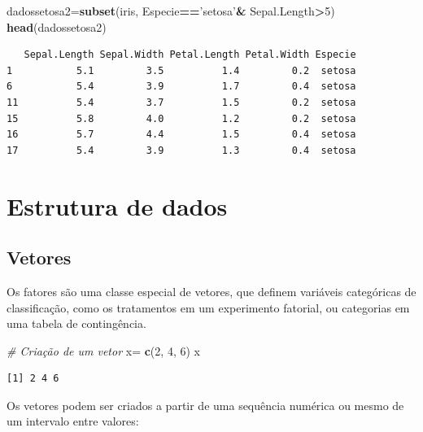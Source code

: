 \documentclass[12pt,brazil,oneside]{book}
\newenvironment{Shaded}{\begin{snugshade}}{\end{snugshade}}
\newcommand{\CommentTok}[1]{\textcolor[rgb]{0.56,0.35,0.01}{\textit{#1}}}
\newcommand{\DecValTok}[1]{\textcolor[rgb]{0.00,0.00,0.81}{#1}}
\newcommand{\KeywordTok}[1]{\textcolor[rgb]{0.13,0.29,0.53}{\textbf{#1}}}
\newcommand{\NormalTok}[1]{#1}
\newcommand{\OperatorTok}[1]{\textcolor[rgb]{0.81,0.36,0.00}{\textbf{#1}}}
\newcommand{\StringTok}[1]{\textcolor[rgb]{0.31,0.60,0.02}{#1}}
\begin{document}
\begin{Shaded}
\begin{Highlighting}[]
\NormalTok{dadossetosa2=}\KeywordTok{subset}\NormalTok{(iris, Especie}\OperatorTok{==}\StringTok{'setosa'}\OperatorTok{&}\StringTok{ }\NormalTok{Sepal.Length}\OperatorTok{>}\DecValTok{5}\NormalTok{)}
\KeywordTok{head}\NormalTok{(dadossetosa2)}
\end{Highlighting}
\end{Shaded}

\begin{verbatim}
   Sepal.Length Sepal.Width Petal.Length Petal.Width Especie
1           5.1         3.5          1.4         0.2  setosa
6           5.4         3.9          1.7         0.4  setosa
11          5.4         3.7          1.5         0.2  setosa
15          5.8         4.0          1.2         0.2  setosa
16          5.7         4.4          1.5         0.4  setosa
17          5.4         3.9          1.3         0.4  setosa
\end{verbatim}

\hypertarget{estrutura-de-dados}{%
\section{Estrutura de dados}\label{estrutura-de-dados}}

\hypertarget{vetores}{%
\subsection{Vetores}\label{vetores}}

Os fatores são uma classe especial de vetores, que definem variáveis
categóricas de classificação, como os tratamentos em um experimento
fatorial, ou categorias em uma tabela de contingência.

\begin{Shaded}
\begin{Highlighting}[]
\CommentTok{# Criação de um vetor}
\NormalTok{x=}\StringTok{ }\KeywordTok{c}\NormalTok{(}\DecValTok{2}\NormalTok{, }\DecValTok{4}\NormalTok{, }\DecValTok{6}\NormalTok{)}
\NormalTok{x}
\end{Highlighting}
\end{Shaded}

\begin{verbatim}
[1] 2 4 6
\end{verbatim}

Os vetores podem ser criados a partir de uma sequência numérica ou mesmo
de um intervalo entre valores:
\end{document}

